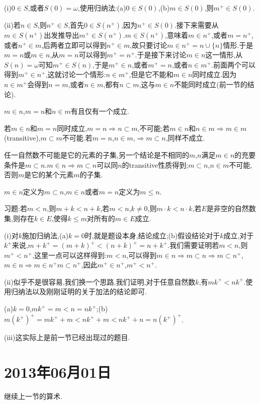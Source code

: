 \documentclass[12pt,a4paper,openany]{book}
\begin{document}
(i)$0 \in S$,或者$S(0)=\omega$,使用归纳法:(a)$0 \in S(0)$,(b)$m \in S(0)$,则$m^+ \in S(0)$.

(ii)若$n \in S$,则$n^+ \in S$,首先$0 \in S(n^+)$,因为$n^+ \in S(0)$.接下来需要从$m \in S(n^+)$出发推导出$m^+ \in S(n^+)$.$m \in S(n^+)$,意味着$m \in n^+$,或者$m=n^+$,或者$n^+ \in m$,后两者立即可以得到$n^+ \in m$,故只要讨论$m \in n^+=n \cup \{n\}$情形.于是$m=n$或$m \in n$,从$m=n$可以得到$m^+=n^+$.于是接下来讨论$m \in n$这一情形,从$S(n)=\omega$可知$m^+ \in S(n)$,于是$m^+ \in n$,或者$m^+=n$,或者$n \in m^+$.前面两个可以得到$m^+ \in n^+$,这就讨论一个情形:$n \in m^+$,但是它不能和$m \in n$同时成立.因为$n \in m^+$会得到$n=m$,或者$n \in m$,都有$n \subset m$,这与$m \in n$不能同时成立(前一节的结论).

$m \in n$,$m=n$和$n \in m$有且仅有一个成立.

若$m \in n$和$m=n$同时成立,$m=n$$\Rightarrow$$n \subset m$,不可能;若$m \in n$和$n \in m$$\Rightarrow$$m \in m$(transitive),$m \subset m$不可能.若$m=n$,$n \in m$,$\Rightarrow$$m \subset n$,同样不成立.

任一自然数不可能是它的元素的子集,另一个结论是不相同的$m$,$n$满足$m \in n$的充要条件是$m \subset n$.$m \in n \Rightarrow m \subset n$可以同$n$的transitive性质得到;$m \subset n$,$n \in m$不可能,否则$m$是它的某个元素$m$的子集.

$m \in n$定义为$m \subset n$,$m \in n$或者$m=n$定义为$m \le n$.

习题:若$m<n$,则$m+k<n+k$,若$m<n$,$k \neq 0$,则$m \cdot k < n \cdot k$,若$E$是非空的自然数集,则存在$k \in E$,使得$k \le m$对所有的$m \in E$成立.

(i)对$k$施加归纳法,(a)$k=0$时,就是题设本身,结论成立;(b)假设结论对于$k$成立,对于$k^+$来说,$m+k^+=(m+k)^+<(n+k)^+=n+k^+$.我们需要证明若$m<n$,则$m^+<n^+$,这里一点可以这样得到:$m<n$,可以得到$m \in n$$\Rightarrow$$m \subset n$$\Rightarrow$$m \subset n^+$,$m \in n$$\Rightarrow$$m \in n^+$$m \subset n^+$,因此$m^+ \in n^+$,$m^+ < n^+$.

(ii)似乎不是很容易,我们换一个思路,我们证明,对于任意自然数$k$,有$mk^+<nk^+$.使用归纳法以及刚刚证明的关于加法的结论即可.

(a)$k=0$,$mk^+=m<n=nk^+$;(b)$m(k^+)^+=mk^++m<nk^++m<nk^++n=n(k^+)^+$.

(iii)这实际上是前一节已经出现过的题目.

\section{2013年06月01日}
继续上一节的算术.
\end{document}
